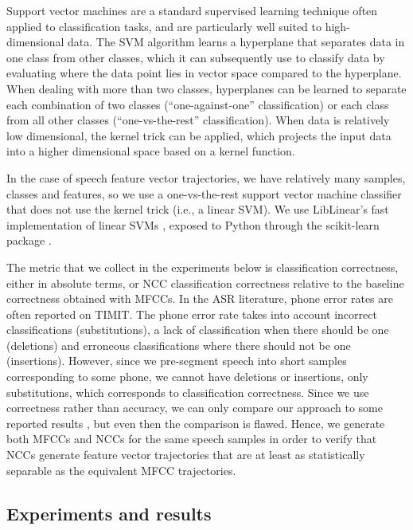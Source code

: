 Support vector machines are a standard
supervised learning technique
often applied to classification tasks,
and are particularly well suited
to high-dimensional data.
The SVM algorithm learns a hyperplane
that separates data
in one class from other classes,
which it can subsequently use
to classify data
by evaluating where the data point
lies in vector space compared to the hyperplane.
When dealing with more than two classes,
hyperplanes can be learned to separate
each combination of two classes
(``one-against-one'' classification)
or each class from all other classes
(``one-vs-the-rest'' classification).
When data is relatively low dimensional,
the kernel trick can be applied,
which projects the input data
into a higher dimensional space
based on a kernel function.

In the case of speech feature vector trajectories,
we have relatively many samples,
classes and features,
so we use a one-vs-the-rest
support vector machine classifier
that does not use the kernel trick
(i.e., a linear SVM).
We use LibLinear's fast implementation
of linear SVMs \citep{fan2008},
exposed to Python through
the scikit-learn package
\citep{pedregosa2011}.

The metric that we collect
in the experiments below
is classification correctness,
either in absolute terms,
or NCC classification correctness
relative to the baseline correctness
obtained with MFCCs.
In the ASR literature,
phone error rates are often
reported on TIMIT.
The phone error rate
takes into account
incorrect classifications
(substitutions),
a lack of classification
when there should be one
(deletions)
and erroneous classifications
where there should not be one
(insertions).
However, since we pre-segment
speech into short samples
corresponding to some phone,
we cannot have deletions or insertions,
only substitutions,
which corresponds to classification correctness.
Since we use correctness
rather than accuracy,
we can only compare our approach
to some reported results
\citep{lopes2011},
but even then the comparison is flawed.
Hence, we generate both MFCCs
and NCCs for the same speech samples
in order to verify that
NCCs generate feature vector trajectories
that are at least as statistically separable
as the equivalent MFCC trajectories.

\subsection{Experiments and results}
\label{sec:results-ncc}

